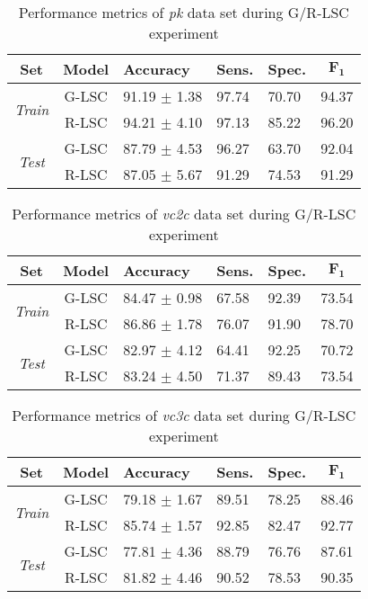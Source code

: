 \begin{table}[!htb]
	\caption{\label{tab:GvR_LSC_performance_pk}Performance metrics of \textit{pk} data set during \mbox{G/R-LSC} experiment}
	\centering
	\begin{tabular}{@{}cclllc@{}}
		\toprule
		\textbf{Set} & \textbf{Model} & \textbf{Accuracy} & \textbf{Sens.} & \textbf{Spec.} & $\mathbf{F_1}$ \\ \midrule
        \multirow{2}{*}{\textit{Train}}   
        & G-LSC & 91.19 $\pm$ 1.38 & 97.74 & 70.70 & 94.37 \\
		& R-LSC & 94.21 $\pm$ 4.10 & 97.13 & 85.22 & 96.20 \\
		\midrule
        \multirow{2}{*}{\textit{Test}}    
        & G-LSC & 87.79 $\pm$ 4.53 & 96.27 & 63.70 & 92.04 \\
        & R-LSC & 87.05 $\pm$ 5.67 & 91.29 & 74.53 & 91.29 \\ 
        \bottomrule
	\end{tabular}
\end{table}

\begin{table}[!htb]
	\caption{\label{tab:GvR_LSC_performance_vc2c}Performance metrics of \textit{vc2c} data set during \mbox{G/R-LSC} experiment}
	\centering
	\begin{tabular}{@{}cclllc@{}}
		\toprule
		\textbf{Set} & \textbf{Model} & \textbf{Accuracy} & \textbf{Sens.} & \textbf{Spec.} & $\mathbf{F_1}$ \\ \midrule
        \multirow{2}{*}{\textit{Train}}
        & G-LSC & 84.47 $\pm$ 0.98 & 67.58 & 92.39 & 73.54 \\
		& R-LSC & 86.86 $\pm$ 1.78 & 76.07 & 91.90 & 78.70 \\
		\midrule
        \multirow{2}{*}{\textit{Test}}   
        & G-LSC & 82.97 $\pm$ 4.12 & 64.41 & 92.25 & 70.72 \\
        & R-LSC & 83.24 $\pm$ 4.50 & 71.37 & 89.43 & 73.54 \\ 
        \bottomrule
	\end{tabular}
\end{table}

\begin{table}[!htb]
	\caption{\label{tab:GvR_LSC_performance_vc3c}Performance metrics of \textit{vc3c} data set during \mbox{G/R-LSC} experiment}
	\centering
	\begin{tabular}{@{}cclllc@{}}
		\toprule
		\textbf{Set} & \textbf{Model} & \textbf{Accuracy} & \textbf{Sens.} & \textbf{Spec.} & $\mathbf{F_1}$ \\ \midrule
        \multirow{2}{*}{\textit{Train}}   
        & G-LSC & 79.18 $\pm$ 1.67 & 89.51 & 78.25 & 88.46 \\
		& R-LSC & 85.74 $\pm$ 1.57 & 92.85 & 82.47 & 92.77 \\
		\midrule
        \multirow{2}{*}{\textit{Test}}    
        & G-LSC & 77.81 $\pm$ 4.36 & 88.79 & 76.76 & 87.61 \\
        & R-LSC & 81.82 $\pm$ 4.46 & 90.52 & 78.53 & 90.35 \\ 
        \bottomrule
	\end{tabular}
\end{table}


